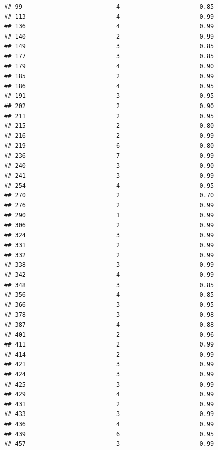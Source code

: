 \documentclass[
]{article}
\begin{document}
\begin{verbatim}
## 99                          4                      0.85
## 113                         4                      0.99
## 136                         4                      0.99
## 140                         2                      0.99
## 149                         3                      0.85
## 177                         3                      0.85
## 179                         4                      0.90
## 185                         2                      0.99
## 186                         4                      0.95
## 191                         3                      0.95
## 202                         2                      0.90
## 211                         2                      0.95
## 215                         2                      0.80
## 216                         2                      0.99
## 219                         6                      0.80
## 236                         7                      0.99
## 240                         3                      0.90
## 241                         3                      0.99
## 254                         4                      0.95
## 270                         2                      0.70
## 276                         2                      0.99
## 290                         1                      0.99
## 306                         2                      0.99
## 324                         3                      0.99
## 331                         2                      0.99
## 332                         2                      0.99
## 338                         3                      0.99
## 342                         4                      0.99
## 348                         3                      0.85
## 356                         4                      0.85
## 366                         3                      0.95
## 378                         3                      0.98
## 387                         4                      0.88
## 401                         2                      0.96
## 411                         2                      0.99
## 414                         2                      0.99
## 421                         3                      0.99
## 424                         3                      0.99
## 425                         3                      0.99
## 429                         4                      0.99
## 431                         2                      0.99
## 433                         3                      0.99
## 436                         4                      0.99
## 439                         6                      0.95
## 457                         3                      0.99

\end{verbatim}
\end{document}
